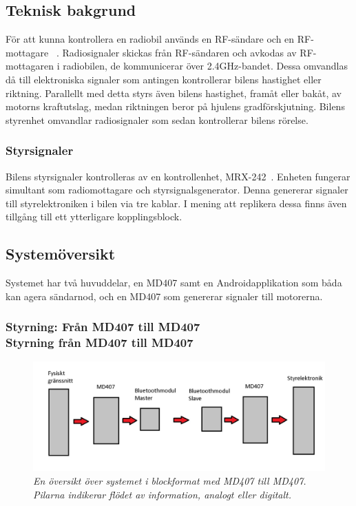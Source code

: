 \documentclass[a4paper]{article}
\begin{document}
\subsection{Teknisk bakgrund}
För att kunna kontrollera en radiobil används en RF-sändare och en RF-mottagare ~\cite{RCTechnique}. Radiosignaler skickas från RF-sändaren och avkodas av RF-mottagaren i radiobilen, de kommunicerar över 2.4GHz-bandet. Dessa omvandlas då till elektroniska signaler som antingen kontrollerar bilens hastighet eller riktning. Parallellt med detta styrs även bilens hastighet, framåt eller bakåt, av motorns kraftutslag, medan riktningen beror på hjulens gradförskjutning. Bilens styrenhet omvandlar radiosignaler som sedan kontrollerar bilens rörelse.

\subsubsection{Styrsignaler}
Bilens styrsignaler kontrolleras av en kontrollenhet, MRX-242~\cite{projektDir}. Enheten fungerar simultant som radiomottagare och styrsignalsgenerator. Denna genererar signaler till styrelektroniken i bilen via tre kablar. I mening att replikera dessa finns även tillgång till ett ytterligare kopplingsblock.


\subsection{Systemöversikt}
Systemet har två huvuddelar, en MD407 samt en Androidapplikation som båda kan agera sändarnod, och en MD407 som genererar signaler till motorerna.

\subsubsection{Styrning: Från MD407 till MD407 \\ Styrning från MD407 till MD407}
\begin{figure}[H]
\includegraphics[width=\textwidth]{systemoversikt.jpg}
\centering
\caption{\it En översikt över systemet i blockformat med MD407 till MD407. Pilarna indikerar flödet av information, analogt eller digitalt.}
\end{figure} 
\end{document}
